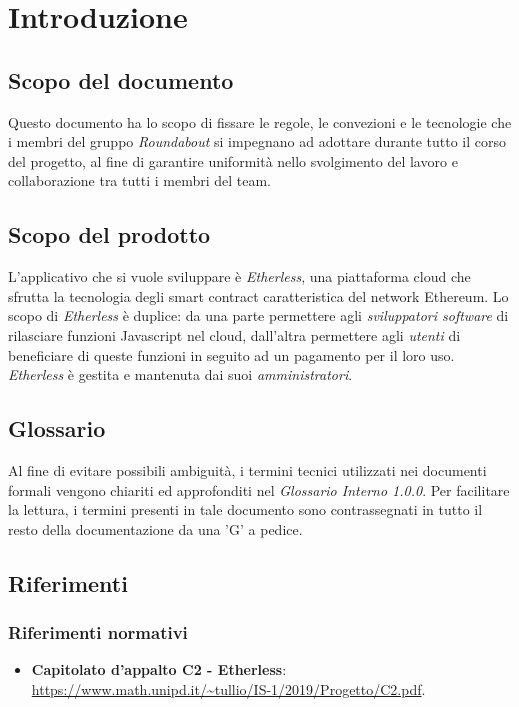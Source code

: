 \section{Introduzione}

\subsection{Scopo del documento}
Questo documento ha lo scopo di fissare le regole, le convezioni e le tecnologie che i membri del gruppo \textit{Roundabout} si impegnano ad adottare durante tutto il corso del progetto, al fine di garantire uniformità nello svolgimento del lavoro e collaborazione tra tutti i membri del team.

\subsection{Scopo del prodotto}
L'applicativo che si vuole sviluppare è \textit{Etherless}, una piattaforma cloud che sfrutta la tecnologia degli smart contract caratteristica del network Ethereum. Lo scopo di \textit{Etherless} è duplice: da una parte permettere agli \textit{sviluppatori software} di rilasciare funzioni Javascript nel cloud, dall'altra permettere agli \textit{utenti} di beneficiare di queste funzioni in seguito ad un pagamento per il loro uso. 
\textit{Etherless} è gestita e mantenuta dai suoi \textit{amministratori}.

\subsection{Glossario}
Al fine di evitare possibili ambiguità, i termini tecnici utilizzati nei documenti formali vengono chiariti ed approfonditi nel \textit{Glossario Interno 1.0.0}. Per facilitare la lettura, i termini presenti in tale documento sono contrassegnati in tutto il resto della documentazione da una 'G' a pedice.

\subsection{Riferimenti}

	\subsubsection{Riferimenti normativi}
	\begin{itemize}
		\item \textbf{Capitolato d'appalto C2 - Etherless}: \\
		\url{https://www.math.unipd.it/~tullio/IS-1/2019/Progetto/C2.pdf}.
	\end{itemize}
	
